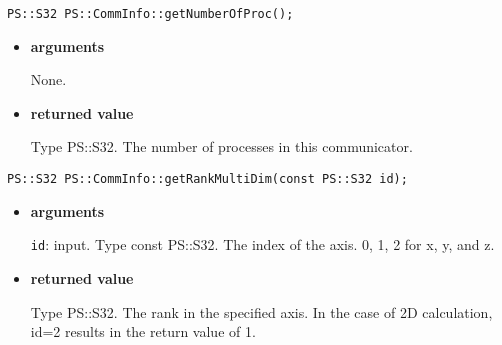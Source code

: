 
\begin{screen}
\begin{verbatim}
PS::S32 PS::CommInfo::getNumberOfProc();
\end{verbatim}
\end{screen}

\begin{itemize}

\item{{\bf arguments}}

None.

\item{{\bf returned value}}

Type PS::S32. The number of processes in this communicator.






\end{itemize}


\begin{screen}
\begin{verbatim}
PS::S32 PS::CommInfo::getRankMultiDim(const PS::S32 id);
\end{verbatim}
\end{screen}

\begin{itemize}

\item{{\bf arguments}}

{\tt id}: input. Type const PS::S32. The index of the axis. 0, 1, 2
for x, y, and z.

\item{{\bf returned value}}

Type PS::S32. The rank in the specified axis. In the case of 2D
calculation, id=2 results in the return value of 1.






\end{itemize}

